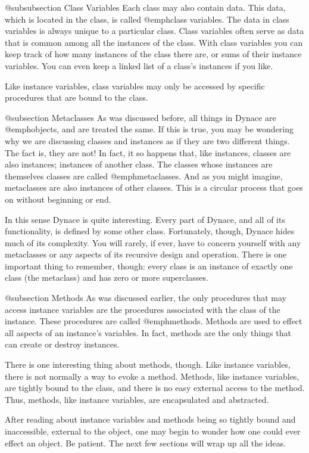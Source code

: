 @subsubsection Class Variables
Each class may also contain data. This data, which is located in the class,
is called @emph{class variables}.  The data in class variables is always
unique to a particular class.  Class variables often serve as data that
is common among all the instances of the class.  With class variables
you can keep track of how many instances of the class there are, or
sums of their instance variables.  You can even keep a linked list of
a class's instances if you like.

Like instance variables, class variables may only be accessed by
specific procedures that are bound to the class.

@subsection Metaclasses
As was discussed before, all things in Dynace are @emph{objects}, and
are treated the same.  If this is true, you may be wondering why we are
discussing classes and instances as if they are two different things.
The fact is, they are not!  In fact, it so happens that, like instances,
classes are also instances; instances of another class.  The classes
whose instances are themselves classes are called @emph{metaclasses}.
And as you might imagine, metaclasses are also instances of other
classes.  This is a circular process that goes on without beginning or
end.

In this sense Dynace is quite interesting.  Every part of Dynace, and all of
its functionality, is defined by some other class.  Fortunately, though,
Dynace hides much of its complexity.  You will rarely, if ever, have to
concern yourself with any metaclasses or any aspects of its recursive
design and operation.  There is one important thing to remember, though:
every class is an instance of exactly one class (the metaclass) and has
zero or more superclasses.

@subsection Methods
As was discussed earlier, the only procedures that may access instance
variables are the procedures associated with the class of the instance.
These procedures are called @emph{methods}.  Methods are used to effect
all aspects of an instance's variables.  In fact, methods are the only
things that can create or destroy instances.

There is one interesting thing about methods, though.  Like instance
variables, there is not normally a way to evoke a method.  Methods,
like instance variables, are tightly bound to the class, and there is
no easy external access to the method.  Thus, methods, like instance
variables, are encapsulated and abstracted.

After reading about instance variables and methods being so tightly
bound and inaccessible, external to the object, one may begin to wonder
how one could ever effect an object.  Be patient.  The next few sections
will wrap up all the ideas.

